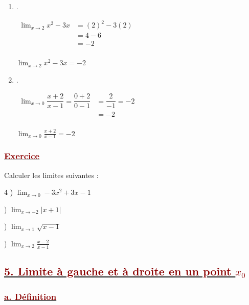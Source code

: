 \documentclass[12pt,a4paper]{article}
\begin{document}
\begin{enumerate}

\item .

$
\begin{aligned} 
\displaystyle 
\lim_{x \to 2} x^2 - 3x &= (2)^2 - 3(2) \\
&= 4 - 6 \\
&= -2 \\
\end{aligned}
$ 


$\boxed{\lim_{x \to 2} x^2 - 3x = -2}$

\vspace{0.6cm}

\item .

$
\begin{aligned} 
\displaystyle \lim_{x \to 0} \dfrac{x+2}{x-1} = \dfrac{0+2}{0-1}
&= \dfrac{2}{-1} = -2 \\
&= -2 \\
\end{aligned}
$ 

$ \boxed{\lim_{x \to 0} \frac{x+2}{x-1} = -2} $ 

\end{enumerate}

\subsubsection*{\underline{\textcolor{darkred}{ Exercice }}}
Calculer les limites suivantes :
\begin{multicols}{4}
) $\displaystyle \lim_{x \to 0} -3x^2 + 3x - 1$

\columnbreak

) $\displaystyle \lim_{x \to -2} |x + 1|$

\columnbreak

) $\displaystyle \lim_{x \to 1} \sqrt{x - 1}$

\columnbreak

) $\displaystyle \lim_{x \to 2} \frac{x - 2}{x - 1}$
\end{multicols}
\subsection*{\underline{\textcolor{darkred}{ 5. Limite à gauche et à droite en un point $x_{0}$ }}}
\subsubsection*{\underline{\textcolor{darkred}{ a. Définition }}}
\end{document}

